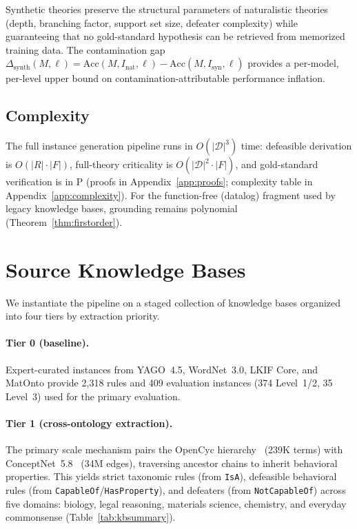 \documentclass{article}
\theoremstyle{definition}
\newcommand{\D}{\mathcal{D}}
\begin{document}
Synthetic theories preserve the structural parameters of naturalistic theories (depth, branching factor, support set size, defeater complexity) while guaranteeing that no gold-standard hypothesis can be retrieved from memorized training data. The contamination gap $\Delta_{\mathrm{synth}}(M, \ell) = \mathrm{Acc}(M, I_{\mathrm{nat}}, \ell) - \mathrm{Acc}(M, I_{\mathrm{syn}}, \ell)$ provides a per-model, per-level upper bound on contamination-attributable performance inflation.


\subsection{Complexity}\label{subsec:complexity}

The full instance generation pipeline runs in $O(|\D|^3)$ time: defeasible derivation is $O(|R| \cdot |F|)$, full-theory criticality is $O(|\D|^2 \cdot |F|)$, and gold-standard verification is in P (proofs in Appendix~\ref{app:proofs}; complexity table in Appendix~\ref{app:complexity}). For the function-free (datalog) fragment used by legacy knowledge bases, grounding remains polynomial (Theorem~\ref{thm:firstorder}).


\section{Source Knowledge Bases}\label{sec:sources}

We instantiate the pipeline on a staged collection of knowledge bases organized into four tiers by extraction priority.

\paragraph{Tier 0 (baseline).}
Expert-curated instances from YAGO~4.5, WordNet~3.0, LKIF Core, and MatOnto provide 2,318 rules and 409 evaluation instances (374 Level~1/2, 35 Level~3) used for the primary evaluation.

\paragraph{Tier 1 (cross-ontology extraction).}
The primary scale mechanism pairs the OpenCyc hierarchy~\cite{lenat1995cyc} (239K terms) with ConceptNet~5.8~\cite{speer2017conceptnet} (34M edges), traversing ancestor chains to inherit behavioral properties. This yields strict taxonomic rules (from \texttt{IsA}), defeasible behavioral rules (from \texttt{CapableOf}/\texttt{HasProperty}), and defeaters (from \texttt{NotCapableOf}) across five domains: biology, legal reasoning, materials science, chemistry, and everyday commonsense (Table~\ref{tab:kbsummary}).
\end{document}
